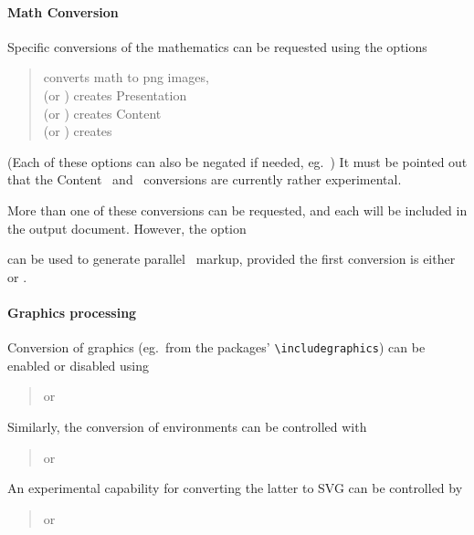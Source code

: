 \documentclass{book}
\begin{document}
\paragraph{Math Conversion}
Specific conversions of the mathematics can be requested
using the options
\begin{quote}
    converts math to png images,\\
  (or ) creates Presentation \MathML\\
  (or ) creates Content \MathML\\
  (or ) creates \OpenMath
\end{quote}
(Each of these options can also be negated if needed, eg.~)
It must be pointed out that the Content \MathML\ and \OpenMath\
conversions are currently rather experimental.

More than one of these conversions can be requested, and
each will be included in the output document.
However, the option
\begin{quote}
\end{quote}
can be used to generate parallel \MathML\ markup, provided the first
conversion is either \code{--pmml} or \code{--cmml}.

\paragraph[Graphics]{Graphics processing}
Conversion of graphics (eg.~from the  packages' 
\verb|\includegraphics|) can be enabled or disabled
using
\begin{quote}
  or 
\end{quote}
Similarly, the conversion of  environments can be controlled with
\begin{quote}
  or 
\end{quote}
An experimental capability for converting the latter to \textsc{SVG} can be
controlled by
\begin{quote}
  or 
\end{quote}
\end{document}
